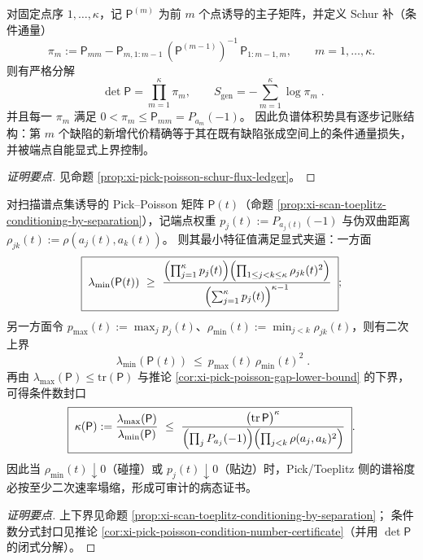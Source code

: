 \begin{conclusion}\label{con:xi-terminal-pick-poisson-schur-ledger}
对固定点序 \(1,\dots,\kappa\)，记 \(\mathsf P^{(m)}\) 为前 \(m\) 个点诱导的主子矩阵，并定义 Schur 补（条件通量）
\[
\pi_m
:=\mathsf P_{mm}-\mathsf P_{m,1:m-1}\,(\mathsf P^{(m-1)})^{-1}\,\mathsf P_{1:m-1,m},
\qquad
m=1,\dots,\kappa.
\]
则有严格分解
\[
\boxed{\;
\det\mathsf P=\prod_{m=1}^{\kappa}\pi_m,
\qquad
S_{\mathrm{gen}}=-\sum_{m=1}^{\kappa}\log\pi_m\; }.
\]
并且每一 \(\pi_m\) 满足 \(0<\pi_m\le \mathsf P_{mm}=P_{a_m}(-1)\)。
因此负谱体积势具有逐步记账结构：第 \(m\) 个缺陷的新增代价精确等于其在既有缺陷张成空间上的条件通量损失，并被端点自能显式上界控制。
\end{conclusion}
\begin{proof}[证明要点]
见命题 \ref{prop:xi-pick-poisson-schur-flux-ledger}。
\end{proof}



\begin{conclusion}\label{con:xi-terminal-pick-poisson-conditioning-collapse}
对扫描谱点集诱导的 Pick--Poisson 矩阵 \(\mathsf P(t)\)（命题 \ref{prop:xi-scan-toeplitz-conditioning-by-separation}），记端点权重 \(p_j(t):=P_{a_j(t)}(-1)\) 与伪双曲距离 \(\rho_{jk}(t):=\rho(a_j(t),a_k(t))\)。
则其最小特征值满足显式夹逼：一方面
\[
\boxed{\;
\lambda_{\min}(\mathsf P(t))
\ \ge\
\frac{\Bigl(\prod_{j=1}^{\kappa}p_j(t)\Bigr)\Bigl(\prod_{1\le j<k\le\kappa}\rho_{jk}(t)^2\Bigr)}
{\Bigl(\sum_{j=1}^{\kappa}p_j(t)\Bigr)^{\kappa-1}}\; } ;
\]
另一方面令 \(p_{\max}(t):=\max_j p_j(t)\)、\(\rho_{\min}(t):=\min_{j<k}\rho_{jk}(t)\)，则有二次上界
\[
\boxed{\;
\lambda_{\min}(\mathsf P(t))\ \le\ p_{\max}(t)\,\rho_{\min}(t)^2\; }.
\]
再由 \(\lambda_{\max}(\mathsf P)\le \mathrm{tr}(\mathsf P)\) 与推论 \ref{cor:xi-pick-poisson-gap-lower-bound} 的下界，可得条件数封口
\[
\boxed{\;
\kappa(\mathsf P)
:=\frac{\lambda_{\max}(\mathsf P)}{\lambda_{\min}(\mathsf P)}
\ \le\
\frac{\bigl(\mathrm{tr}\,\mathsf P\bigr)^{\kappa}}
{\Bigl(\prod_{j}P_{a_j}(-1)\Bigr)\Bigl(\prod_{j<k}\rho(a_j,a_k)^2\Bigr)}\; }.
\]
因此当 \(\rho_{\min}(t)\downarrow 0\)（碰撞）或 \(p_j(t)\downarrow 0\)（贴边）时，Pick/Toeplitz 侧的谱裕度必按至少二次速率塌缩，形成可审计的病态证书。
\end{conclusion}
\begin{proof}[证明要点]
上下界见命题 \ref{prop:xi-scan-toeplitz-conditioning-by-separation}；
条件数分式封口见推论 \ref{cor:xi-pick-poisson-condition-number-certificate}（并用 \(\det\mathsf P\) 的闭式分解）。
\end{proof}

